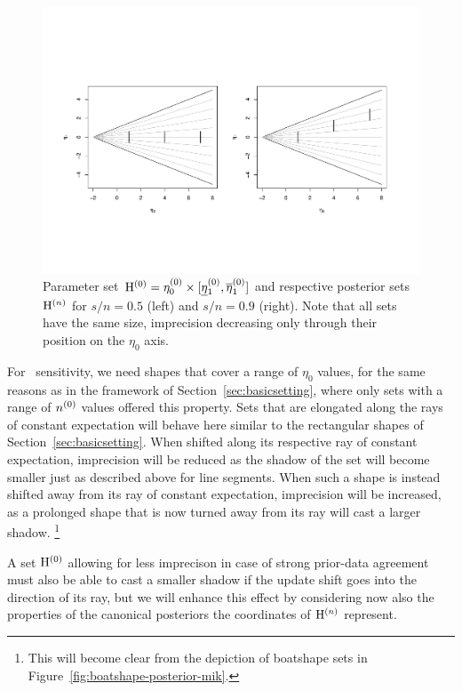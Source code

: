 \begin{figure}  %
\centering
\includegraphics[trim = 15mm 45mm 25mm 60mm, clip, width=\textwidth]{R/boatshape-vertical}
\caption[Line segment parameter set $\EZ$ %
and respective posterior sets for $s/n=0.5$ and $s/n=0.9$.]%
{Parameter set $\mathrm{H}^{(0)} = \eta_0^{(0)} \times [\text{\underline{$\eta$}${}_1^{(0)}$},\overline{\eta}_1^{(0)}]$ and respective posterior sets $\mathrm{H}^{(n)}$
for $s/n=0.5$ (left) and $s/n=0.9$ (right). Note that all sets have the same size,
imprecision decreasing only through their position on the $\eta_0$ axis.}
\label{fig:boatshape-vertical}
\end{figure}

For \pdc\ sensitivity, we need shapes that cover a range of $\eta_0$ values,
for the same reasons as in the framework of Section~\ref{sec:basicsetting},
where only sets with a range of $n^{(0)}$ values offered this property.
Sets that are elongated along the rays of constant expectation
will behave here similar to the rectangular shapes of Section~\ref{sec:basicsetting}.
When shifted along its respective ray of constant expectation,
imprecision will be reduced as the shadow of the set will become smaller just as described above for line segments.
When such a shape is instead shifted away from its ray of constant expectation,
imprecision will be increased, as a prolonged shape that is now turned away from its ray 
will cast a larger shadow.%
\footnote{This will become clear from the depiction of boatshape sets in Figure~\ref{fig:boatshape-posterior-mik}.} 

A set $\EZ$ allowing for less imprecison in case of strong prior-data agreement
must also be able to cast a smaller shadow if the update shift goes into the direction of its ray,
but we will enhance this effect by considering now also the properties
of the canonical posteriors the coordinates of $\mathrm{H}^{(n)}$ represent.

